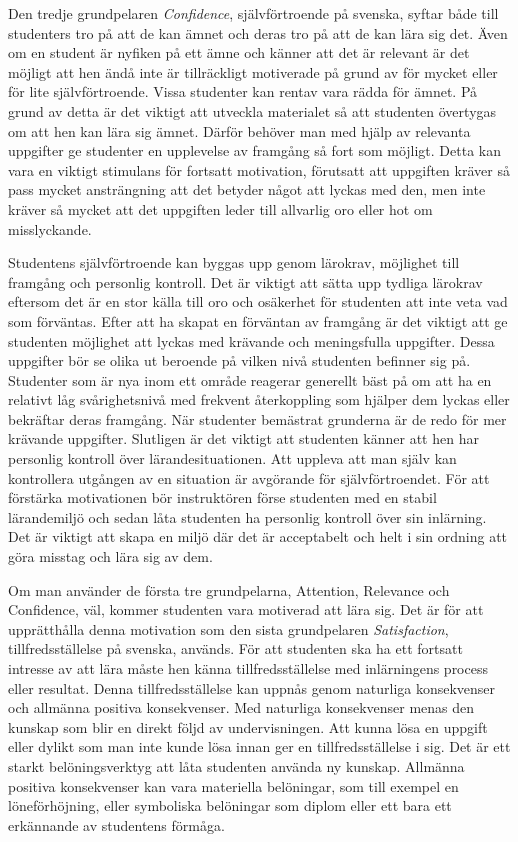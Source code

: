 \documentclass[12pt,a4paper,twoside,openright]{article}
\begin{document}
Den tredje grundpelaren \textit{Confidence}, självförtroende på
svenska, syftar både till studenters tro på att de kan ämnet och deras
tro på att de kan lära sig det. Även om en student är nyfiken på ett
ämne och känner att det är relevant är det möjligt att hen ändå inte
är tillräckligt motiverade på grund av för mycket eller för lite
självförtroende. Vissa studenter kan rentav vara rädda för ämnet. På
grund av detta är det viktigt att utveckla materialet så att studenten
övertygas om att hen kan lära sig ämnet. Därför behöver man med hjälp
av relevanta uppgifter ge studenter en upplevelse av framgång så fort
som möjligt. Detta kan vara en viktigt stimulans för fortsatt
motivation, förutsatt att uppgiften kräver så pass mycket ansträngning
att det betyder något att lyckas med den, men inte kräver så mycket
att det uppgiften leder till allvarlig oro eller hot om misslyckande.

Studentens självförtroende kan byggas upp genom lärokrav, möjlighet
till fram\-gång och personlig kontroll. Det är viktigt att sätta upp
tydliga lärokrav eftersom det är en stor källa till oro och osäkerhet
för studenten att inte veta vad som förväntas. Efter att ha
skapat en förväntan av framgång är det viktigt att ge studenten
möjlighet att lyckas med krävande och meningsfulla uppgifter. Dessa
uppgifter bör se olika ut beroende på vilken nivå studenten befinner
sig på. Studenter som är nya inom ett område reagerar generellt bäst
på om att ha en relativt låg svårighetsnivå med frekvent återkoppling
som hjälper dem lyckas eller bekräftar deras framgång. När studenter
bemästrat grunderna är de redo för mer krävande uppgifter. Slutligen
är det viktigt att studenten känner att hen har personlig kontroll
över lärandesituationen. Att uppleva att man själv kan kontrollera
utgången av en situation är avgörande för självförtroendet. För att
förstärka motivationen bör instruktören förse studenten med en stabil
lärandemiljö och sedan låta studenten ha personlig kontroll över sin
inlärning. Det är viktigt att skapa en miljö där det är acceptabelt
och helt i sin ordning att göra misstag och lära sig av dem.

Om man använder de första tre grundpelarna, Attention, Relevance och
Confidence, väl, kommer studenten vara motiverad att lära sig. Det är
för att upprätthålla denna motivation som den sista grundpelaren
\textit{Satisfaction}, tillfredsställelse på svenska, används. För att
studenten ska ha ett fortsatt intresse av att lära måste hen känna
tillfredsställelse med inlärningens process eller resultat. Denna
tillfredsställelse kan uppnås genom naturliga konsekvenser och
allmänna positiva konsekvenser. Med naturliga konsekvenser menas den
kunskap som blir en direkt följd av undervisningen. Att kunna lösa en
uppgift eller dylikt som man inte kunde lösa innan ger en
tillfredsställelse i sig. Det är ett starkt belöningsverktyg att låta
studenten använda ny kunskap. Allmänna positiva konsekvenser kan vara
materiella belöningar, som till exempel en löneförhöjning, eller
symboliska belöningar som diplom eller ett bara ett erkännande av
studentens förmåga.
\end{document}
